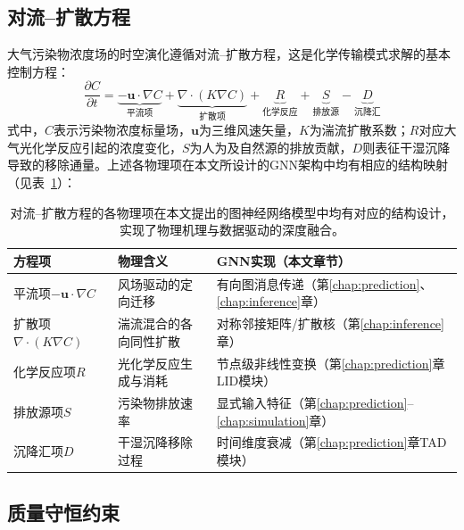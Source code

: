 \subsection{对流--扩散方程}
\label{subsec:advection_diffusion}

大气污染物浓度场的时空演化遵循对流--扩散方程，这是化学传输模式求解的基本控制方程：
\begin{equation}
\frac{\partial C}{\partial t} = \underbrace{-\mathbf{u} \cdot \nabla C}_{\text{平流项}} + \underbrace{\nabla \cdot (K \nabla C)}_{\text{扩散项}} + \underbrace{R}_{\text{化学反应}} + \underbrace{S}_{\text{排放源}} - \underbrace{D}_{\text{沉降汇}}
\label{eq:advection_diffusion}
\end{equation}
\noindent 式中，$C$表示污染物浓度标量场，$\mathbf{u}$为三维风速矢量，$K$为湍流扩散系数；$R$对应大气光化学反应引起的浓度变化，$S$为人为及自然源的排放贡献，$D$则表征干湿沉降导致的移除通量。上述各物理项在本文所设计的GNN架构中均有相应的结构映射（见表~\ref{tab:pde_gnn_mapping}）：

\begin{table}[htbp]
    \centering
    \caption{对流--扩散方程各项与GNN设计的对应关系}
    \caption*{对流--扩散方程的各物理项在本文提出的图神经网络模型中均有对应的结构设计，实现了物理机理与数据驱动的深度融合。}
    \label{tab:pde_gnn_mapping}
    \begin{tabular}{@{}lll@{}}
        \toprule
        方程项 & 物理含义 & GNN实现（本文章节） \\
        \midrule
        平流项$-\mathbf{u} \cdot \nabla C$ & 风场驱动的定向迁移 & 有向图消息传递（第\ref{chap:prediction}、\ref{chap:inference}章） \\
        扩散项$\nabla \cdot (K \nabla C)$ & 湍流混合的各向同性扩散 & 对称邻接矩阵/扩散核（第\ref{chap:inference}章） \\
        化学反应项$R$ & 光化学反应生成与消耗 & 节点级非线性变换（第\ref{chap:prediction}章LID模块） \\
        排放源项$S$ & 污染物排放速率 & 显式输入特征（第\ref{chap:prediction}--\ref{chap:simulation}章） \\
        沉降汇项$D$ & 干湿沉降移除过程 & 时间维度衰减（第\ref{chap:prediction}章TAD模块） \\
        \bottomrule
    \end{tabular}
\end{table}

\subsection{质量守恒约束}
\label{subsec:physics_constraints}

